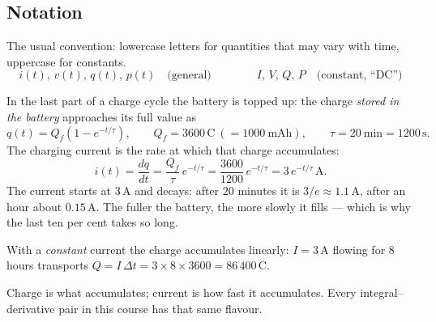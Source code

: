 \documentclass[11pt,a4paper]{article}
\newcommand{\Icol}[1]{\textcolor{ccur}{#1}}
\newcommand{\Qcol}[1]{\textcolor{ccharge}{#1}}
\newcommand{\uni}[1]{\,\mathrm{#1}}
\newcommand{\A}{\uni{A}}   \newcommand{\V}{\uni{V}}
\newcommand{\Cb}{\uni{C}}  \newcommand{\s}{\uni{s}}
\begin{document}
\subsection{Notation}

The usual convention: lowercase letters for quantities that may vary with time, uppercase
for constants.
\[
  i(t),\, v(t),\, q(t),\, p(t) \quad\text{(general)}
  \qquad\qquad
  I,\, V,\, Q,\, P \quad\text{(constant, ``DC'')}
\]

\begin{center}
\end{center}



\begin{examplebox}
In the last part of a charge cycle the battery is topped up: the charge \emph{stored in
the battery} approaches its full value as
\[
  q(t) = Q_f\left(1 - e^{-t/\tau}\right),
  \qquad Q_f = 3600\Cb \ (= 1000\ \text{mAh}), \qquad \tau = 20\ \text{min} = 1200\s .
\]
The charging current is the rate at which that charge accumulates:
\[
  i(t) = \frac{dq}{dt} = \frac{Q_f}{\tau}\,e^{-t/\tau}
       = \frac{3600}{1200}\,e^{-t/\tau} = 3\,e^{-t/\tau}\A .
\]
The current starts at $3\A$ and decays: after $20$ minutes it is $3/e \approx 1.1\A$,
after an hour about $0.15\A$. The fuller the battery, the more slowly it fills --- which
is why the last ten per cent takes so long.

\smallskip
With a \emph{constant} current the charge accumulates linearly: $I = 3\A$ flowing for
$8$ hours transports
$Q = I\,\Delta t = 3 \times 8 \times 3600 = 86\,400\Cb$.

\smallskip
\Qcol{Charge} is what accumulates; \Icol{current} is how fast it accumulates. Every
integral--derivative pair in this course has that same flavour.
\end{examplebox}
\end{document}
